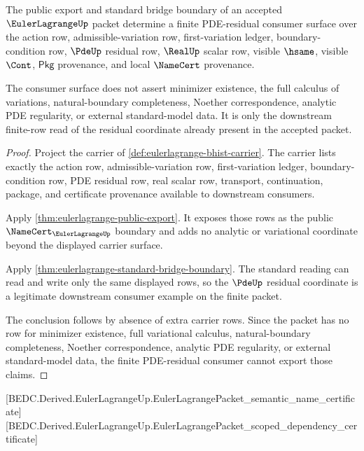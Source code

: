 \begin{theorem}
\label{thm:eulerlagrange-finite-pde-consumer-example}
The public export and standard bridge boundary of an accepted
$\EulerLagrangeUp$ packet determine a finite PDE-residual consumer surface over
the action row, admissible-variation row, first-variation ledger,
boundary-condition row, $\PdeUp$ residual row, $\RealUp$ scalar row, visible
$\hsame$, visible $\Cont$, $\mathsf{Pkg}$ provenance, and local $\NameCert$
provenance.

The consumer surface does not assert minimizer existence, the full calculus of
variations, natural-boundary completeness, Noether correspondence, analytic PDE
regularity, or external standard-model data. It is only the downstream
finite-row read of the residual coordinate already present in the accepted
packet.
\end{theorem}
\begin{proof}
Project the carrier of \autoref{def:eulerlagrange-bhist-carrier}. The carrier
lists exactly the action row, admissible-variation row, first-variation ledger,
boundary-condition row, PDE residual row, real scalar row, transport,
continuation, package, and certificate provenance available to downstream
consumers.

Apply \autoref{thm:eulerlagrange-public-export}. It exposes those rows as the
public $\NameCert_{\EulerLagrangeUp}$ boundary and adds no analytic or
variational coordinate beyond the displayed carrier surface.

Apply \autoref{thm:eulerlagrange-standard-bridge-boundary}. The standard
reading can read and write only the same displayed rows, so the $\PdeUp$
residual coordinate is a legitimate downstream consumer example on the finite
packet.

The conclusion follows by absence of extra carrier rows. Since the packet has
no row for minimizer existence, full variational calculus, natural-boundary
completeness, Noether correspondence, analytic PDE regularity, or external
standard-model data, the finite PDE-residual consumer cannot export those
claims.
\end{proof}

[BEDC.Derived.EulerLagrangeUp.EulerLagrangePacket\_semantic\_name\_certificate]
[BEDC.Derived.EulerLagrangeUp.EulerLagrangePacket\_scoped\_dependency\_certificate]

